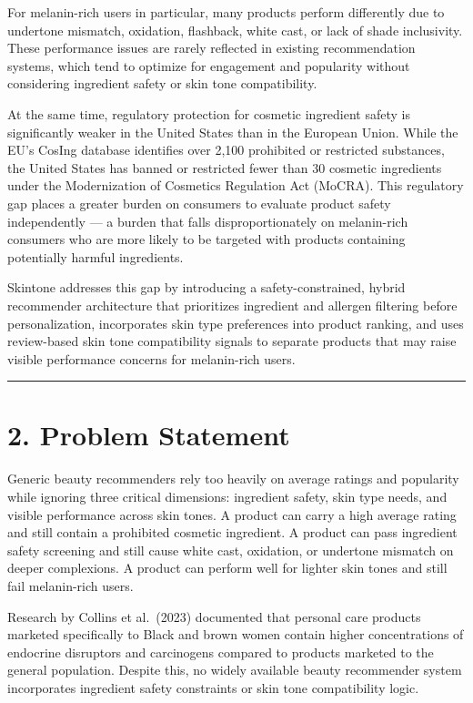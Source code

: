\documentclass[
  letterpaper,
  DIV=11,
  numbers=noendperiod]{scrartcl}
\begin{document}
For melanin-rich users in particular, many products perform differently
due to undertone mismatch, oxidation, flashback, white cast, or lack of
shade inclusivity. These performance issues are rarely reflected in
existing recommendation systems, which tend to optimize for engagement
and popularity without considering ingredient safety or skin tone
compatibility.

At the same time, regulatory protection for cosmetic ingredient safety
is significantly weaker in the United States than in the European Union.
While the EU's CosIng database identifies over 2,100 prohibited or
restricted substances, the United States has banned or restricted fewer
than 30 cosmetic ingredients under the Modernization of Cosmetics
Regulation Act (MoCRA). This regulatory gap places a greater burden on
consumers to evaluate product safety independently --- a burden that
falls disproportionately on melanin-rich consumers who are more likely
to be targeted with products containing potentially harmful ingredients.

Skintone addresses this gap by introducing a safety-constrained, hybrid
recommender architecture that prioritizes ingredient and allergen
filtering before personalization, incorporates skin type preferences
into product ranking, and uses review-based skin tone compatibility
signals to separate products that may raise visible performance concerns
for melanin-rich users.

\begin{center}\rule{0.5\linewidth}{0.5pt}\end{center}

\section{2. Problem Statement}\label{problem-statement}

Generic beauty recommenders rely too heavily on average ratings and
popularity while ignoring three critical dimensions: ingredient safety,
skin type needs, and visible performance across skin tones. A product
can carry a high average rating and still contain a prohibited cosmetic
ingredient. A product can pass ingredient safety screening and still
cause white cast, oxidation, or undertone mismatch on deeper
complexions. A product can perform well for lighter skin tones and still
fail melanin-rich users.

Research by Collins et al.~(2023) documented that personal care products
marketed specifically to Black and brown women contain higher
concentrations of endocrine disruptors and carcinogens compared to
products marketed to the general population. Despite this, no widely
available beauty recommender system incorporates ingredient safety
constraints or skin tone compatibility logic.
\end{document}
